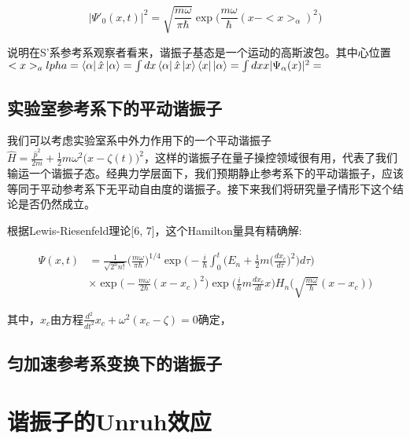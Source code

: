 \documentclass[a4paper]{article}
\begin{document}
        \begin{equation}
            |\Psi'_0(x,t)|^2 = \sqrt{\frac{m\omega}{\pi\hbar}}\exp\bigg(\frac{m\omega}{\hbar}(x-<x>_\alpha)^2\bigg)
        \end{equation}

        说明在S'系参考系观察者看来，谐振子基态是一个运动的高斯波包。其中心位置$<x>_alpha = \bra{\alpha}\hat{x}\ket{\alpha} = \int dx \bra{\alpha}\hat{x}\ket{x}\bra{x}\ket{\alpha} = \int dx x |\Psi_\alpha(x)|^2 = $

    \subsection{实验室参考系下的平动谐振子}
        我们可以考虑实验室系中外力作用下的一个平动谐振子$\hat{H}=\frac{\hat{p}^2}{2m}+\frac{1}{2}m\omega^2\big(\hat{x}-\zeta(t)\big)^2$，这样的谐振子在量子操控领域很有用，代表了我们输运一个谐振子态。经典力学层面下，我们预期静止参考系下的平动谐振子，应该等同于平动参考系下无平动自由度的谐振子。接下来我们将研究量子情形下这个结论是否仍然成立。

        根据Lewis-Riesenfeld理论[6, 7]，这个Hamilton量具有精确解:

        \begin{equation}
            \begin{split}  
                \Psi(x,t)& =\frac{1}{\sqrt{2^n n!}}\bigg(\frac{m\omega}{\pi\hbar}\bigg)^{1/4} \exp\bigg(-\frac{i}{\hbar}\int_0^t \bigg(E_n+\frac{1}{2}m\big(\frac{dx_c}{d\tau}\big)^2\bigg)d\tau\bigg) \\
                    & \times\exp\bigg(-\frac{m\omega}{2\hbar}(x-x_c)^2\bigg) \exp\bigg(\frac{i}{\hbar}m\frac{dx_c}{dt}x\bigg) H_n\bigg(\sqrt{\frac{m\omega}{\hbar}}(x-x_c)\bigg)
            \end{split}
        \end{equation}
    
        其中，$x_c$由方程$\frac{d^2}{dt^2}x_c+\omega^2(x_c-\zeta)=0$确定，

    \subsection{匀加速参考系变换下的谐振子}

    \section{谐振子的Unruh效应}
\end{document}
